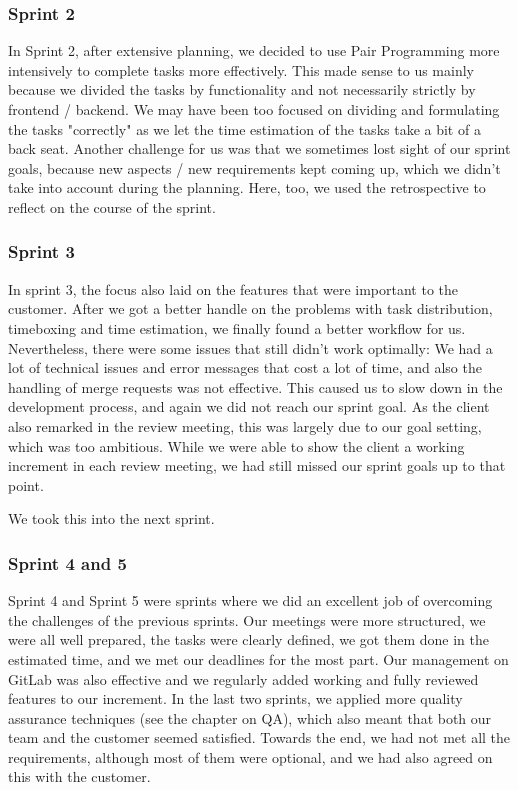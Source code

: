 \subsubsection{Sprint 2}
    In Sprint 2, after extensive planning, we decided to use Pair Programming more intensively to complete tasks more effectively.
This made sense to us mainly because we divided the tasks by functionality and not necessarily strictly by frontend / backend.
We may have been too focused on dividing and formulating the tasks "correctly" as we let the time estimation of the tasks take a bit of a back seat.
Another challenge for us was that we sometimes lost sight of our sprint goals, because new aspects / new requirements kept coming up, which we didn't take into account during the planning.
Here, too, we used the retrospective to reflect on the course of the sprint.

\subsubsection{Sprint 3}
    In sprint 3, the focus also laid on the features that were important to the customer.
After we got a better handle on the problems with task distribution, timeboxing and time estimation, we finally found a better workflow for us.
Nevertheless, there were some issues that still didn't work optimally: We had a lot of technical issues and error messages that cost a lot of time, and also the handling of merge requests was not effective.
This caused us to slow down in the development process, and again we did not reach our sprint goal.
As the client also remarked in the review meeting, this was largely due to our goal setting, which was too ambitious.
While we were able to show the client a working increment in each review meeting, we had still missed our sprint goals up to that point.

We took this into the next sprint.
\subsubsection{Sprint 4 and 5}
    Sprint 4 and Sprint 5 were sprints where we did an excellent job of overcoming the challenges of the previous sprints.
Our meetings were more structured, we were all well prepared, the tasks were clearly defined, we got them done in the estimated time, and we met our deadlines for the most part.
Our management on GitLab was also effective and we regularly added working and fully reviewed features to our increment.
In the last two sprints, we applied more quality assurance techniques (see the chapter on QA), which also meant that both our team and the customer seemed satisfied.
Towards the end, we had not met all the requirements, although most of them were optional, and we had also agreed on this with the customer.

